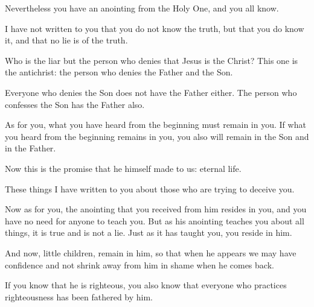 \begin{scripture}
 Nevertheless you have an anointing from the Holy One, and you all know.
 I have not written to you that you do not know the truth, but that you do know it, and that no lie is of the truth.
 Who is the liar but the person who denies that Jesus is the Christ? This one is the antichrist: the person who denies the Father and the Son.
 Everyone who denies the Son does not have the Father either. The person who confesses the Son has the Father also.
\everypar{}

 As for you, what you have heard from the beginning must remain in you. If what you heard from the beginning remains in you, you also will remain in the Son and in the Father.
 Now this is the promise that he himself made to us: eternal life.
 These things I have written to you about those who are trying to deceive you.
\everypar{}

 Now as for you, the anointing that you received from him resides in you, and you have no need for anyone to teach you. But as his anointing teaches you about all things, it is true and is not a lie. Just as it has taught you, you reside in him.
\everypar{}

 And now, little children, remain in him, so that when he appears we may have confidence and not shrink away from him in shame when he comes back.
 If you know that he is righteous, you also know that everyone who practices righteousness has been fathered by him.


\end{scripture}
